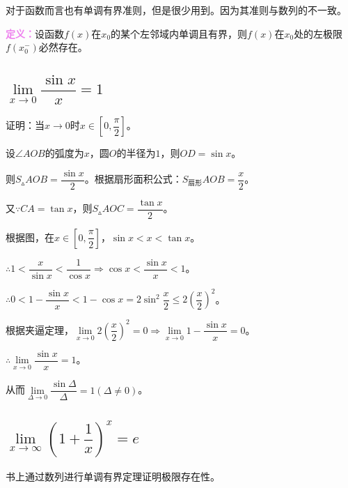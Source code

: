 \documentclass[UTF8, 12pt]{ctexart}
\begin{document}
对于函数而言也有单调有界准则，但是很少用到。因为其准则与数列的不一致。

\textcolor{violet}{\textbf{定义：}}设函数$f(x)$在$x_0$的某个左邻域内单调且有界，则$f(x)$在$x_0$处的左极限$f(x_0^-)$必然存在。

\subsection{\texorpdfstring{$\lim\limits_{x\to 0}\dfrac{\sin x}{x}=1$}{}}

证明：当$x\to 0$时$x\in[0,\dfrac{\pi}{2}]$。


设$\angle AOB$的弧度为$x$，圆$O$的半径为$1$，则$OD=\sin x$。

则$S_\vartriangle AOB=\dfrac{\sin x}{2}$。根据扇形面积公式：$S_{\text{扇形}}AOB=\dfrac{x}{2}$。

又$\because CA=\tan x$，则$S_\vartriangle AOC=\dfrac{\tan x}{2}$。

根据图，在$x\in[0,\dfrac{\pi}{2}]$，$\sin x<x<\tan x$。

$\therefore 1<\dfrac{x}{\sin x}<\dfrac{1}{\cos x}\Rightarrow\cos x<\dfrac{\sin x}{x}<1$。

$\therefore 0<1-\dfrac{\sin x}{x}<1-\cos x=2\sin^2\dfrac{x}{2}\leqslant 2\left(\dfrac{x}{2}\right)^2$。

根据夹逼定理，$\lim\limits_{x\to 0}2\left(\dfrac{x}{2}\right)^2=0\Rightarrow\lim\limits_{x\to 0}1-\dfrac{\sin x}{x}=0$。

$\therefore\lim\limits_{x\to 0}\dfrac{\sin x}{x}=1$。

从而$\lim\limits_{\Delta\to 0}\dfrac{\sin\Delta}{\Delta}=1(\Delta\neq 0)$。

\subsection{\texorpdfstring{$\lim\limits_{x\to\infty}\left(1+\dfrac{1}{x}\right)^x=e$}{}}

书上通过数列进行单调有界定理证明极限存在性。
\end{document}
